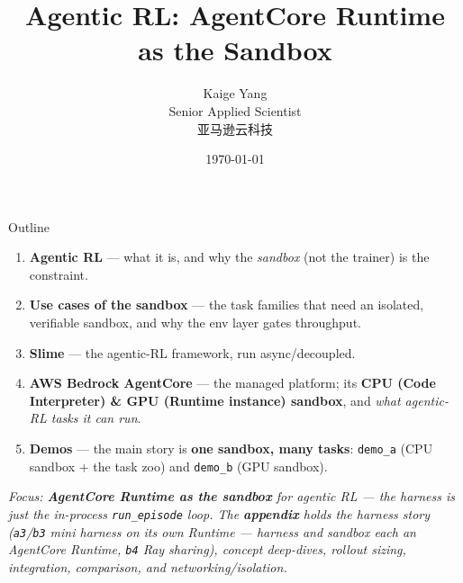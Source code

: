 \documentclass[aspectratio=169]{beamer}
\title[Agentic RL]{Agentic RL: AgentCore Runtime as the Sandbox}
\author[Kaige Yang]{Kaige Yang \\ Senior Applied Scientist \\ 亚马逊云科技}
\date{\today}
\begin{document}
\begin{frame}
  \titlepage
\end{frame}

\begin{frame}{Outline}
  \small
  \begin{enumerate}\setlength\itemsep{0.28em}
    \item \textbf{Agentic RL} --- what it is, and why the
      \emph{sandbox} (not the trainer) is the constraint.
    \item \textbf{Use cases of the sandbox} --- the task families that need an
      isolated, verifiable sandbox, and why the env layer gates throughput.
    \item \textbf{Slime} --- the agentic-RL framework, run async/decoupled.
    \item \textbf{AWS Bedrock AgentCore} --- the managed platform; its \textbf{CPU (Code
      Interpreter) \& GPU (Runtime instance) sandbox}, and \emph{what agentic-RL tasks it can run}.
    \item \textbf{Demos} --- the main story is \textbf{one sandbox, many tasks}:
      \texttt{demo\_a} (CPU sandbox + the task zoo) and \texttt{demo\_b} (GPU sandbox).
  \end{enumerate}
  \vspace{0.5em}
  {\footnotesize\itshape Focus: \textbf{AgentCore Runtime as the sandbox} for agentic RL --- the
  harness is just the in-process \texttt{run\_episode} loop. The \textbf{appendix} holds the
  \emph{harness} story (\texttt{a3}/\texttt{b3} mini harness on its own Runtime --- harness \emph{and}
  sandbox each an AgentCore Runtime, \texttt{b4} Ray sharing), concept deep-dives, rollout sizing, integration,
  comparison, and networking/isolation.}
\end{frame}
\end{document}
